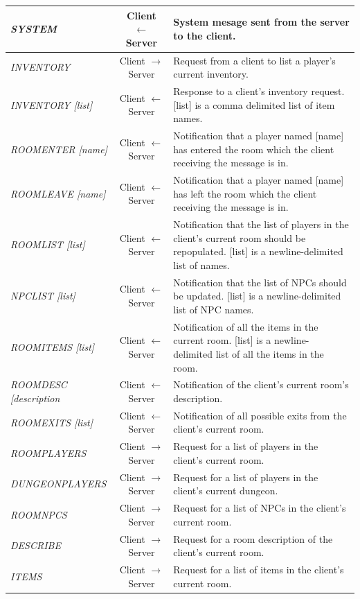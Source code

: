 \documentclass[a4paper]{article}
\begin{document}
\begin{appendices}
\begin{longtable}{|l|c|p{8 cm}|}
\hline
\textit{SYSTEM} & Client $\leftarrow$ Server & System mesage sent from the server to the client.\\
\hline
\textit{INVENTORY} & Client $\rightarrow$ Server & Request from a client to list a player's current inventory.\\
\hline
\textit{INVENTORY [list]} & Client $\leftarrow$ Server & Response to a client's inventory request. [list] is a comma delimited list of item names.\\
\hline
\textit{ROOMENTER [name]} & Client $\leftarrow$ Server & Notification that a player named [name] has entered the room which the client receiving the message is in.\\
\hline
\textit{ROOMLEAVE [name]} & Client $\leftarrow$ Server & Notification that a player named [name] has left the room which the client receiving the message is in.\\
\hline
\textit{ROOMLIST [list]} & Client $\leftarrow$ Server & Notification that the list of players in the client's current room should be repopulated. [list] is a newline-delimited list of names.\\
\hline
\textit{NPCLIST [list]}  & Client $\leftarrow$ Server & Notification that the list of NPCs should be updated. [list] is a newline-delimited list of NPC names.\\
\hline
\textit{ROOMITEMS [list]} & Client $\leftarrow$ Server & Notification of all the items in the current room. [list] is a newline- delimited list of all the items in the room.\\
\hline
\textit{ROOMDESC [description} & Client $\leftarrow$ Server & Notification of the client's current room's description.\\
\hline
\textit{ROOMEXITS [list]} & Client $\leftarrow$ Server & Notification of all possible exits from the client's current room.\\
\hline
\textit{ROOMPLAYERS} & Client $\rightarrow$ Server & Request for a list of players in the client's current room.\\
\hline
\textit{DUNGEONPLAYERS} & Client $\rightarrow$ Server & Request for a list of players in the client's current dungeon.\\
\hline
\textit{ROOMNPCS} & Client $\rightarrow$ Server & Request for a list of NPCs in the client's current room.\\
\hline
\textit{DESCRIBE} & Client $\rightarrow$ Server & Request for a room description of the client's current room.\\
\hline
\textit{ITEMS} & Client $\rightarrow$ Server & Request for a list of items in the client's current room.\\

\end{longtable}
\end{appendices}
\end{document}
